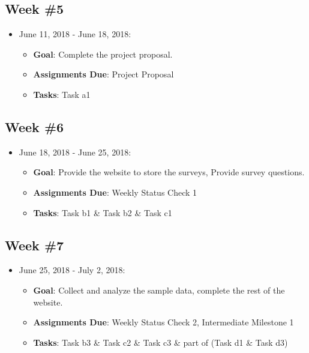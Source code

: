 \documentclass{sigchi}
\begin{document}
\subsection{Week \#5}
\begin{itemize}
 	\item June 11, 2018 - June 18, 2018:
	\begin{itemize}
 		\item \textbf{Goal}: Complete the project proposal.
 		\item \textbf{Assignments Due}: Project Proposal
 		\item \textbf{Tasks}: Task a1
 	\end{itemize} 
 \end{itemize}


\subsection{Week \#6}
\begin{itemize}
 	\item June 18, 2018 - June 25, 2018:
	\begin{itemize}
 		\item \textbf{Goal}: Provide the website to store the surveys, Provide survey questions.
 		\item \textbf{Assignments Due}: Weekly Status Check 1
 		\item \textbf{Tasks}: Task b1 \& Task b2 \& Task c1
	\end{itemize}
 \end{itemize} 
 
 \subsection{Week \#7}
\begin{itemize}
 	\item June 25, 2018 - July 2, 2018:
	\begin{itemize}
 		\item \textbf{Goal}: Collect and analyze the sample data, complete the rest of the website.
 		\item \textbf{Assignments Due}: Weekly Status Check 2, Intermediate Milestone 1
 		\item \textbf{Tasks}: Task b3 \& Task c2 \& Task c3 \& part of (Task d1 \& Task d3)
 	\end{itemize} 
\end{itemize}
 
\end{document}
